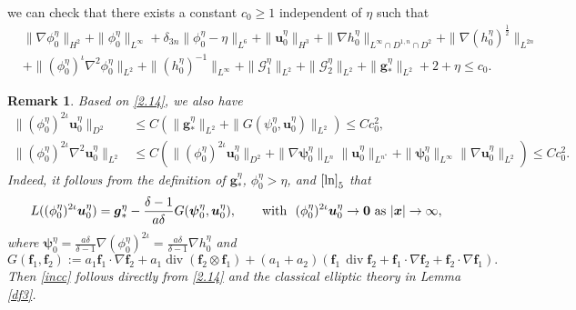 \documentclass[11pt,reqno]{amsart}
\DeclareMathOperator{\diver}{\mathrm{div}}
\newtheorem{rk}{Remark}
\numberwithin{rk}{section}
\numberwithin{prop}{section}
\numberwithin{mydef}{section}
\numberwithin{lem}{section}
\numberwithin{equation}{section}
\numberwithin{thm}{section}
\begin{document}
we can check that there exists a constant $c_0\geq 1$ independent of $\eta$ such that
\begin{equation}\label{2.14}
\begin{aligned}
&\|\nabla\phi^\eta_0\|_{H^2}+\|\phi^\eta_0\|_{ L^\infty}+\delta_{3n}\|\phi^\eta_0-\eta\|_{ L^6}+\|\boldsymbol{u}^\eta_0\|_{H^3}+\|\nabla h^\eta_0\|_{L^\infty\cap D^{1,n}\cap D^2}+\|\nabla (h^\eta_0)^{\frac{1}{2}}\|_{L^{2n}}
\\
&+\|(\phi^\eta_0)^\iota\nabla^2\phi^\eta_0\|_{L^2}+\|(h^\eta_0)^{-1}\|_{L^\infty}+\|\mathcal{G}^\eta_1\|_{L^2}+\|\mathcal{G}^\eta_2\|_{L^2}+\|\boldsymbol{g}^\eta_*\|_{L^2}+2+\eta\leq c_0.
\end{aligned}
\end{equation}






\begin{rk}\label{r1}
Based on \eqref{2.14}, we also have
\begin{equation}\label{incc}
\begin{aligned}
\|(\phi^\eta_0)^{2\iota}\boldsymbol{u}^\eta_0\|_{D^2}&\leq C(\|\boldsymbol{g}^\eta_*\|_{L^2}+\|G(\psi^\eta_0,\boldsymbol{u}^\eta_0)\|_{L^2})\leq Cc^2_0,\\
\|(\phi^\eta_0)^{2\iota}\nabla^2\boldsymbol{u}^\eta_0\|_{L^2}&\leq  C(\|(\phi^\eta_0)^{2\iota}\boldsymbol{u}^\eta_0\|_{D^2}+\|\nabla\boldsymbol{\psi}^\eta_0\|_{L^n}\|\boldsymbol{u}^\eta_0\|_{L^{n^*}}+\|\boldsymbol{\psi}^\eta_0\|_{L^\infty}\|\nabla \boldsymbol{u}^\eta_0\|_{L^2})\leq Cc^2_0.
\end{aligned}
\end{equation}
Indeed, it follows from  the definition of $\boldsymbol{g}^\eta_*$, $\phi^\eta_0>\eta$, and  $\eqref{ln}_5$  that 
\begin{equation*} 
L((\phi^\eta_0)^{2\iota}\boldsymbol{u}^\eta_0)=\boldsymbol{g}^\eta_*-\frac{\delta-1}{a\delta}G(\boldsymbol{\psi}^\eta_0,\boldsymbol{u}^\eta_0),\qquad \text{with \ $
(\phi^\eta_0)^{2\iota}\boldsymbol{u}^\eta_0\to \boldsymbol{0}$ as $|\boldsymbol{x}|\to \infty$},
\end{equation*}
where $\boldsymbol{\psi}^\eta_0=\frac{a\delta}{\delta-1}\nabla(\phi^\eta_0)^{2\iota}=\frac{a\delta}{\delta-1}\nabla h^\eta_0$ and 
\begin{equation}\label{Gdingyi}
G(\boldsymbol{f}_1,\boldsymbol{f}_2):=a_1\boldsymbol{f}_1\cdot\nabla \boldsymbol{f}_2+a_1  \diver(\boldsymbol{f}_2\otimes\boldsymbol{f}_1)+(a_1+a_2)(\boldsymbol{f}_1\,\diver \boldsymbol{f}_2+\boldsymbol{f}_1\cdot\nabla \boldsymbol{f}_2+\boldsymbol{f}_2\cdot\nabla\boldsymbol{f}_1).
\end{equation}
Then \eqref{incc} follows directly from \eqref{2.14} and the classical elliptic theory in {\rm Lemma \ref{df3}}.
\end{rk}
\end{document}
